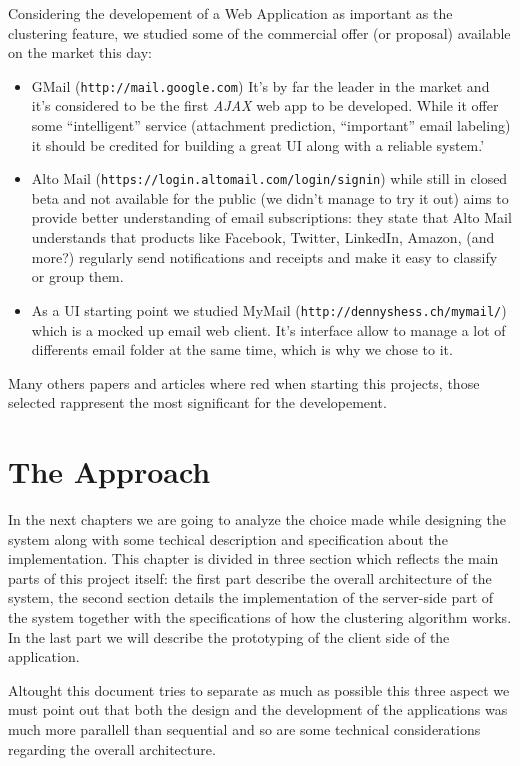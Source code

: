 \documentclass[a4paper,12pt]{report}
\begin{document}
Considering the developement of a Web Application as important as the clustering feature, we studied some of the commercial offer (or proposal) available on the market this day:
\begin{itemize}
\item GMail (\texttt{http://mail.google.com}) It's by far the leader in the market and it's considered to be the first \emph{AJAX} web app to be developed. While it offer some ``intelligent'' service (attachment prediction, ``important'' email labeling) it should be credited for building a great UI along with a reliable system.'
\item Alto Mail (\texttt{https://login.altomail.com/login/signin}) while still in closed beta and not available for the public (we didn't manage to try it out) aims to provide better understanding of email subscriptions: they state that Alto Mail understands that products like Facebook, Twitter, LinkedIn, Amazon, (and more?) regularly send notifications and receipts and make it easy to classify or group them. 
\item As a UI starting point we studied MyMail (\texttt{http://dennyshess.ch/mymail/}) which is a mocked up email web client. It's interface allow to manage a lot of differents email folder at the same time, which is why we chose to it.
\end{itemize}
Many others papers and articles where red when starting this projects, those selected rappresent the most significant for the developement.
 

\chapter{The Approach}
In the next chapters we are going to analyze the choice made while designing the system along with some techical description and specification about the implementation. This chapter is divided in three section which reflects the main parts of this project itself: the first part describe the overall architecture of the system, the second section details the implementation of the server-side part of the system together with the specifications of how the clustering algorithm works. In the last part we will describe the prototyping of the client side of the application.

Altought this document tries to separate as much as possible this three aspect we must point out that both the design and the development of the applications was much more parallell than sequential and so are some technical considerations regarding the overall architecture.
\end{document}

